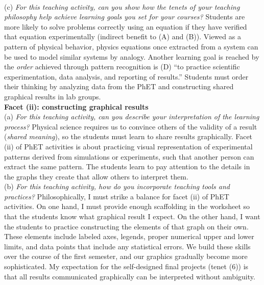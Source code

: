 \documentclass[../../../main.tex]{subfiles}
\begin{document}
\\
\vspace{0.15cm}
(c) \textit{For this teaching activity, can you show how the tenets of your teaching philosophy help achieve learning goals you
set for your courses?}  Students are more likely to solve problems correctly using an equation if they have verified that equation experimentally (indirect benefit to (A) and (B)).  Viewed as a pattern of physical behavior, physics equations once extracted from a system can be used to model similar systems by analogy.  Another learning goal is reached by the \textit{order} achieved through pattern recognition is (D) ``to practice scientific experimentation, data analysis, and reporting of results.''  Students must order their thinking by analyzing data from the PhET and constructing shared graphical results in lab groups.
\\
\vspace{0.15cm}
\textbf{Facet (ii): constructing graphical results}
\\
\vspace{0.15cm}
(a) \textit{For this teaching activity, can you describe your interpretation of the learning process?} Physical science requires us to convince others of the validity of a result (\textit{shared meaning}), so the students must learn to share results graphically.  Facet (ii) of PhET activities is about practicing visual representation of experimental patterns derived from simulations or experiments, such that another person can extract the same pattern.  The students learn to pay attention to the details in the graphs they create that allow others to interpret them.
\\
\vspace{0.15cm}
(b) \textit{For this teaching activity, how do you incorporate teaching tools and practices?} Philosophically, I must strike a balance for facet (ii) of PhET activities.  On one hand, I must provide enough scaffolding in the worksheet so that the students know what graphical result I expect.  On the other hand, I want the students to practice constructing the elements of that graph on their own.  These elements include labeled axes, legends, proper numerical upper and lower limits, and data points that include any statistical errors.  We build these skills over the course of the first semester, and our graphics gradually become more sophisticated.  My expectation for the self-designed final projects (tenet (6)) is that all results communicated graphically can be interpreted without ambiguity. 
\\
\end{document}
